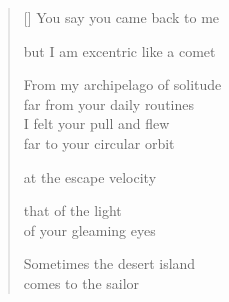 \documentclass[12pt,a4paper]{article}
\begin{document}
\thispagestyle{empty}

\poemtitle{}

\settowidth{\versewidth}{From my archipelago of solitude}

\bigskip

\begin{verse}[\versewidth]
  You say you came back to me

  but I am excentric like a comet

  From my archipelago of solitude \\
  far from your daily routines\\
  I felt your pull and flew\\
  far to your circular orbit

  at the escape velocity

  that of the light \\
  of your gleaming eyes

  Sometimes the desert island \\
  comes to the sailor
\end{verse}
\end{document}
